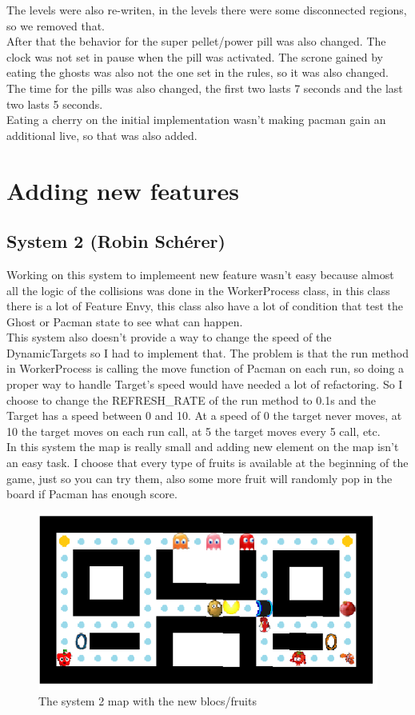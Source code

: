 \documentclass[]{article}
\begin{document}
The levels were also re-writen, in the levels there were some disconnected regions, so we removed that. 
\\

After that the behavior for the super pellet/power pill was also changed. The clock was not set in pause when the pill was activated. The scrone gained by eating the ghosts was also not the one set in the rules, so it was also changed. The time for the pills was also changed, the first two lasts 7 seconds and the last two lasts 5 seconds.
\\

Eating a cherry on the initial implementation wasn't making pacman gain an additional live, so that was also added.


\newpage
\section{Adding new features}
\subsection{System 2 (Robin Schérer)}

Working on this system to implemeent new feature wasn't easy because almost all the logic of the collisions was done in the WorkerProcess class, in this class there is a lot of Feature Envy, this class also have a lot of condition that test the Ghost or Pacman state to see what can happen. \\

This system also doesn't provide a way to change the speed of the DynamicTargets so I had to implement that. The problem is that the run method in WorkerProcess is calling the move function of Pacman on each run, so doing a proper way to handle Target's speed would have needed a lot of refactoring. So I choose to change the REFRESH\_RATE of the run method to 0.1s and the Target has a speed between 0 and 10. At a speed of 0 the target never moves, at 10 the target moves on each run call, at 5 the target moves every 5 call, etc.  \\

In this system the map is really small and adding new element on the map isn't an easy task. I choose that every type of fruits is available at the beginning of the game, just so you can try them, also some more fruit will randomly pop in the board if Pacman has enough score. \\

\begin{figure}[h!]
\centering
\includegraphics[width=0.75\linewidth]{map.png}
\caption{The system 2 map with the new blocs/fruits}
\label{fig:map}
\end{figure}
\end{document}
